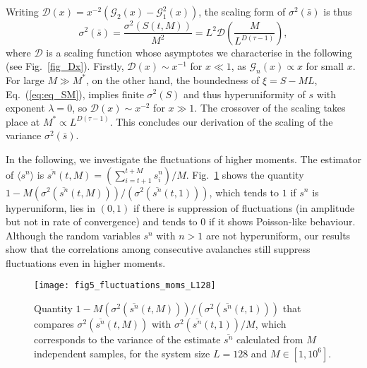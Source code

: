 \documentclass[doublecol]{epl2}
\newcommand{\elabel}[1]{\label{eq:#1}}
\newcommand{\Eref}[1]{Eq.~(\ref{eq:#1})}
\newcommand{\Figref}[1]{Fig.~\ref{fig_#1}}
\begin{document}
Writing $\mathcal{D}(x) = x^{-2}\left(\mathcal{G}_2(x)-\mathcal{G}_1^2(x)\right)$, the scaling form of $\sigma^2\left(\bar{s}\right)$ is thus
\begin{equation}
\sigma^2\left(\bar{s}\right) = \frac{\sigma^2\left(S(t,M)\right)}{M^2} =L^2 \mathcal{D}\left(\frac{M}{L^{D(\tau-1)}}\right),
\elabel{eq_Dx}
\end{equation}
where $\mathcal{D}$ is a scaling function whose asymptotes we characterise in the following (see \Figref{Dx}). Firstly, $\mathcal{D}(x)\sim x^{-1}$ for $x\ll 1$, as $\mathcal{G}_n(x)\propto x$ for small $x$. For large $M\gg M^*$, on the other hand, the boundedness of $\xi=S-ML$, \Eref{eq_SM}, implies finite $\sigma^2(S)$ and thus hyperuniformity of $s$ with exponent $\lambda=0$, so $\mathcal{D}(x)\sim x^{-2}$ for $x\gg 1$. The crossover of the scaling takes place at $M^*\propto L^{D(\tau-1)}$. This concludes our derivation of the scaling of the variance $\sigma^2\left(\bar{s}\right)$.

In the following, we investigate the fluctuations of higher moments.
The estimator of $\langle s ^n\rangle$ is $\overline{s^n}(t,M)=\left(\sum_{i=t+1}^{t+M}s_i^n\right)/M$. \Figref{hyp_sn_0} shows the quantity $1-M\left(\sigma^2\left(\overline{s^n}(t,M)\right)\right)/\left(\sigma^2\left(\overline{s^n}(t,1)\right)\right)$, which tends to $1$ if $s^n$ is hyperuniform, lies in $(0,1)$ if there is suppression of fluctuations (in amplitude but not in rate of convergence) and tends to $0$ if it shows Poisson-like behaviour.
Although the random variables $s^n$ with $n>1$ are not hyperuniform, our results show that the correlations among consecutive avalanches still suppress fluctuations even in higher moments.
 
 \begin{figure}
 \texttt{[image: fig5\_fluctuations\_moms\_L128]}
 \caption{ \label{fig_hyp_sn_0} Quantity $1-M\left(\sigma^2\left(\overline{s^n}(t,M)\right)\right)/\left(\sigma^2\left(\overline{s^n}(t,1)\right)\right)$ that compares $\sigma^2\left(\overline{s^n}(t,M)\right)$ with $\sigma^2\left(\overline{s^n}(t,1)\right)/M$, which corresponds to the variance of the estimate $\overline{s^n}$ calculated from $M$ independent samples, for the system size $L=128$ and $M\in\left[1,10^6\right]$.}
 \end{figure}
\end{document}
